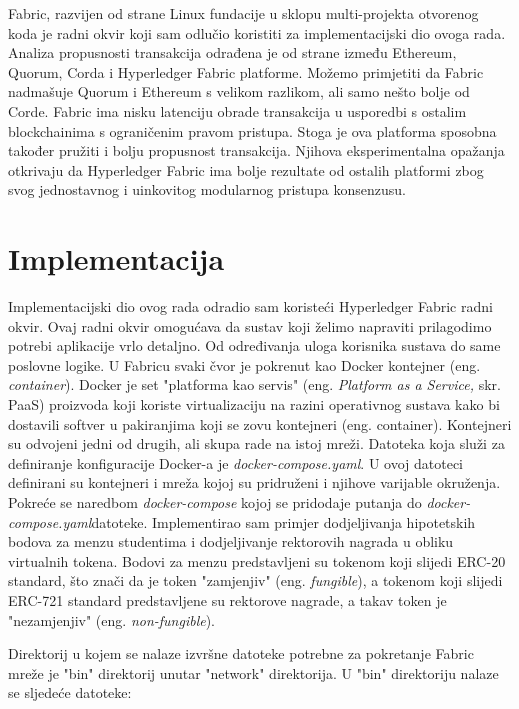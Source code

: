 \documentclass[times, utf8, diplomski]{fer}
\begin{document}
Fabric, razvijen od strane Linux fundacije u sklopu multi-projekta otvorenog koda je radni okvir koji sam odlučio koristiti za implementacijski dio ovoga rada. Analiza propusnosti transakcija odrađena je od strane \citep{9411380} između Ethereum, Quorum, Corda i Hyperledger Fabric platforme. Možemo primjetiti da Fabric nadmašuje Quorum i Ethereum s velikom razlikom, ali samo nešto bolje od Corde. Fabric ima nisku latenciju obrade transakcija u usporedbi s ostalim blockchainima s ograničenim pravom pristupa. Stoga je ova platforma sposobna također pružiti i bolju propusnost transakcija. Njihova eksperimentalna opažanja otkrivaju da Hyperledger Fabric ima bolje rezultate od ostalih platformi zbog svog jednostavnog i uinkovitog modularnog pristupa konsenzusu.

\chapter{Implementacija}
Implementacijski dio ovog rada odradio sam koristeći Hyperledger Fabric radni okvir.  Ovaj radni okvir omogućava da sustav koji želimo napraviti prilagodimo potrebi aplikacije vrlo detaljno. Od određivanja uloga korisnika sustava do same poslovne logike. U Fabricu svaki čvor je pokrenut kao Docker kontejner (eng. \textit{container}). Docker je set "platforma kao servis" (eng. \textit{Platform as a Service,} skr. PaaS) proizvoda koji koriste virtualizaciju na razini operativnog sustava kako bi dostavili softver u pakiranjima koji se zovu kontejneri (eng. container). Kontejneri su odvojeni jedni od drugih, ali skupa rade na istoj mreži. Datoteka koja služi za definiranje konfiguracije Docker-a je \textit{docker-compose.yaml}. U ovoj datoteci definirani su kontejneri i mreža kojoj su pridruženi i njihove varijable okruženja. Pokreće se naredbom \textit{docker-compose} kojoj se pridodaje putanja do \textit{docker-compose.yaml}datoteke.
Implementirao sam primjer dodjeljivanja hipotetskih bodova za menzu studentima i dodjeljivanje rektorovih nagrada u obliku virtualnih tokena. Bodovi za menzu predstavljeni su tokenom koji slijedi ERC-20 standard, što znači da je token "zamjenjiv" (eng. \textit{fungible}), a tokenom koji slijedi ERC-721 standard predstavljene su rektorove nagrade, a takav token je "nezamjenjiv" (eng. \textit{non-fungible}).

Direktorij u kojem se nalaze izvršne datoteke potrebne za pokretanje Fabric mreže je "bin" direktorij unutar "network" direktorija. U "bin" direktoriju nalaze se sljedeće datoteke:
\end{document}
